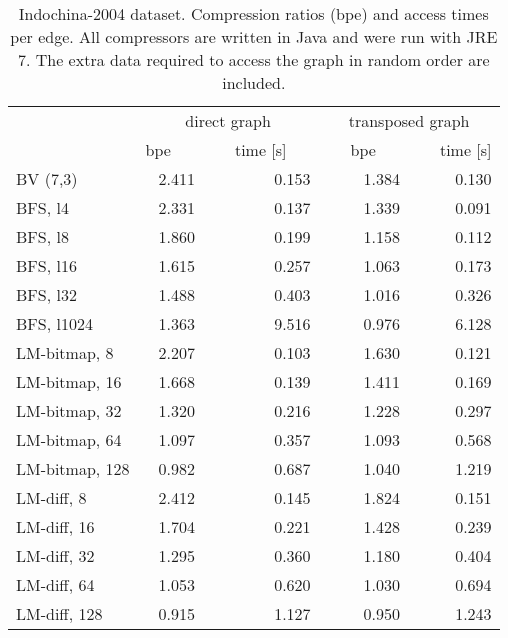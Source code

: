 \documentclass[envcountsame]{llncs}
\begin{document}
\begin{table}
\centering
\begin{tabular}{lrrrr}
\hline
        & \multicolumn{2}{c}{direct graph} & \multicolumn{2}{c}{transposed graph} \\
\cline{2-5}
        &  bpe~~~&~~~time [s]~~~&~~~bpe~~~&~~~time [s] \\
\hline
BV (7,3) & 2.411 & 0.153 & 1.384 & 0.130 \\
BFS, l4 & 2.331 & 0.137 & 1.339 & 0.091 \\
BFS, l8 & 1.860 & 0.199 & 1.158 & 0.112 \\
BFS, l16 & 1.615 & 0.257 & 1.063 & 0.173 \\
BFS, l32 & 1.488 & 0.403 & 1.016 & 0.326 \\
BFS, l1024 & 1.363 & 9.516 & 0.976 & 6.128 \\
LM-bitmap, 8 & 2.207 & 0.103 & 1.630 & 0.121 \\
LM-bitmap, 16 & 1.668 & 0.139 & 1.411 & 0.169 \\
LM-bitmap, 32 & 1.320 & 0.216 & 1.228 & 0.297 \\
LM-bitmap, 64 & 1.097 & 0.357 & 1.093 & 0.568 \\
LM-bitmap, 128 & 0.982 & 0.687 & 1.040 & 1.219 \\
LM-diff, 8 & 2.412 & 0.145 & 1.824 & 0.151 \\
LM-diff, 16 & 1.704 & 0.221 & 1.428 & 0.239 \\
LM-diff, 32 & 1.295 & 0.360 & 1.180 & 0.404 \\
LM-diff, 64 & 1.053 & 0.620 & 1.030 & 0.694 \\
LM-diff, 128 & 0.915 & 1.127 & 0.950 & 1.243 \\
\hline
\end{tabular}
\vspace{4mm}
\caption{Indochina-2004 dataset. Compression ratios (bpe) and access times per edge. 
All compressors are written in Java and were run with JRE 7.
The extra data required to access the graph in random order are included.
}
\label{table:app_indochina}
\end{table}
\end{document}
